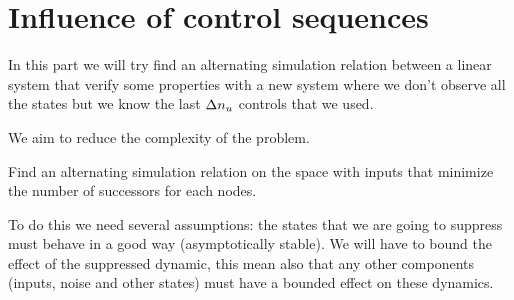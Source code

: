 \section{Influence of control sequences}
In this part we will try find an alternating simulation relation between a linear system that verify some properties with a new system where we don't observe all the states but we know the last $\Delta n_u$ controls that we used.

We aim to reduce the complexity of the problem.

\begin{problem}
Find an alternating simulation relation on the space with inputs that minimize the number of successors for each nodes.
\end{problem}

To do this we need several assumptions: the states that we are going to suppress must behave in a good way (asymptotically stable).
We will have to bound the effect of the suppressed dynamic, this mean also that any other components (inputs, noise and other states) must have a bounded effect on these dynamics.

